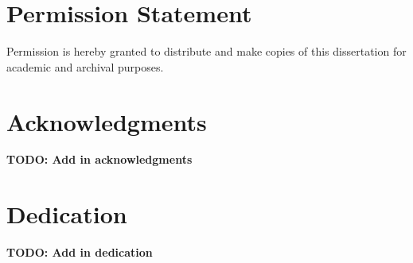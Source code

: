 \section*{Permission Statement}
Permission is hereby granted to distribute and make copies of this dissertation for academic and archival purposes.

\section*{Acknowledgments}
\textbf{TODO: Add in acknowledgments}


\section*{Dedication}
\textbf{TODO: Add in dedication}

\newpage

